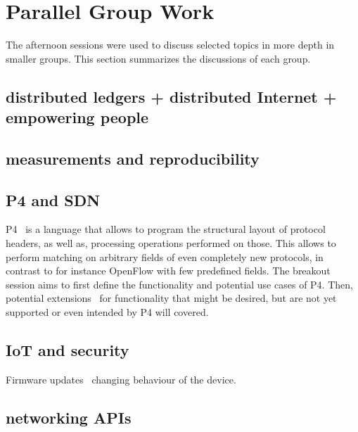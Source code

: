\section{Parallel Group Work}\label{sec:parallel-group-work}

The afternoon sessions were used to discuss selected topics in more depth in
smaller groups. This section summarizes the discussions of each group.


\subsection{distributed ledgers + distributed Internet + empowering people}

\subsection{measurements and reproducibility}

\cite{fbai:infocom:2003}

\subsection{P4 and SDN}

P4~\cite{pbosshart:ccr:2014} is a language that allows to program the
structural layout of protocol headers, as well as, processing operations
performed on those.  This allows to perform matching on arbitrary fields of
even completely new protocols, in contrast to for instance OpenFlow with few
predefined fields.  The breakout session aims to first define the
functionality and potential use cases of P4.  Then, potential
extensions~\cite{abhashkumar:sosr:2017} for functionality that might be
desired, but are not yet supported or even intended by P4 will covered.

\subsection{IoT and security}

Firmware updates~\cite{philips, hp} changing behaviour of the device.

\subsection{networking APIs}
